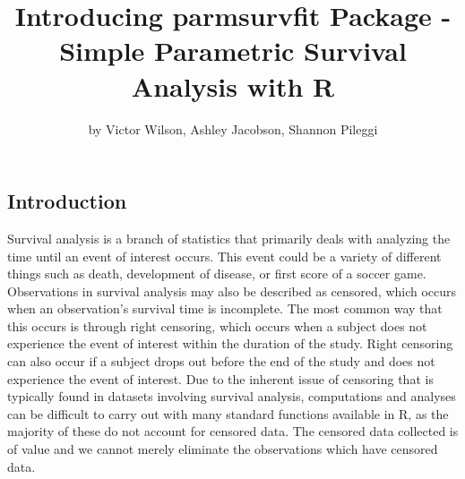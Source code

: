 \title{Introducing parmsurvfit Package - Simple Parametric Survival Analysis
with R}
\author{by Victor Wilson, Ashley Jacobson, Shannon Pileggi}

\maketitle



\hypertarget{introduction}{%
\subsection{Introduction}\label{introduction}}

Survival analysis is a branch of statistics that primarily deals with
analyzing the time until an event of interest occurs. This event could
be a variety of different things such as death, development of disease,
or first score of a soccer game. Observations in survival analysis may
also be described as censored, which occurs when an observation's
survival time is incomplete. The most common way that this occurs is
through right censoring, which occurs when a subject does not experience
the event of interest within the duration of the study. Right censoring
can also occur if a subject drops out before the end of the study and
does not experience the event of interest. Due to the inherent issue of
censoring that is typically found in datasets involving survival
analysis, computations and analyses can be difficult to carry out with
many standard functions available in R, as the majority of these do not
account for censored data. The censored data collected is of value and
we cannot merely eliminate the observations which have censored data.


